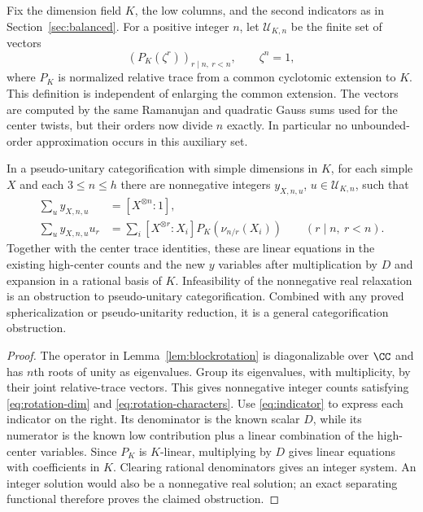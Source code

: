 Fix the dimension field $K$, the low columns, and the second indicators
as in Section~\ref{sec:balanced}. For a positive integer $n$, let
$\mathcal U_{K,n}$ be the finite set of vectors
\[
 (P_K(\zeta^r))_{r\mid n,\ r<n},\qquad \zeta^n=1,
\]
where $P_K$ is normalized relative trace from a common cyclotomic
extension to $K$. This definition is independent of enlarging the common
extension. The vectors are computed by the same Ramanujan and quadratic
Gauss sums used for the center twists, but their orders now divide $n$
exactly. In particular no unbounded-order approximation occurs in this
auxiliary set.

\begin{theorem}\label{thm:rotation}
In a pseudo-unitary categorification with simple dimensions in $K$, for
each simple $X$ and each $3\le n\le h$ there are nonnegative integers
$y_{X,n,u}$, $u\in\mathcal U_{K,n}$, such that
\begin{align}
 \sum_u y_{X,n,u}&=[X^{\otimes n}:1],\label{eq:rotation-dim}\\
 \sum_u y_{X,n,u}u_r
 &=\sum_i[X^{\otimes r}:X_i]P_K(\nu_{n/r}(X_i))
       \qquad(r\mid n,\ r<n).\label{eq:rotation-characters}
\end{align}
Together with the center trace identities, these are linear equations
in the existing high-center counts and the new $y$ variables after
multiplication by $D$ and expansion in a rational basis of $K$.
Infeasibility of the nonnegative real relaxation is an obstruction to
pseudo-unitary categorification. Combined with any proved
sphericalization or pseudo-unitarity reduction, it is a general
categorification obstruction.
\end{theorem}
\begin{proof}
The operator in Lemma~\ref{lem:blockrotation} is diagonalizable over
$\CC$ and has $n$th roots of unity as eigenvalues. Group its eigenvalues,
with multiplicity, by their joint relative-trace vectors. This gives
nonnegative integer counts satisfying \eqref{eq:rotation-dim} and
\eqref{eq:rotation-characters}. Use \eqref{eq:indicator} to express each
indicator on the right. Its denominator is the known scalar $D$, while
its numerator is the known low contribution plus a linear combination
of the high-center variables. Since $P_K$ is $K$-linear, multiplying by
$D$ gives linear equations with coefficients in $K$. Clearing rational
denominators gives an integer system. An integer solution would also be
a nonnegative real solution; an exact separating functional therefore
proves the claimed obstruction.
\end{proof}

